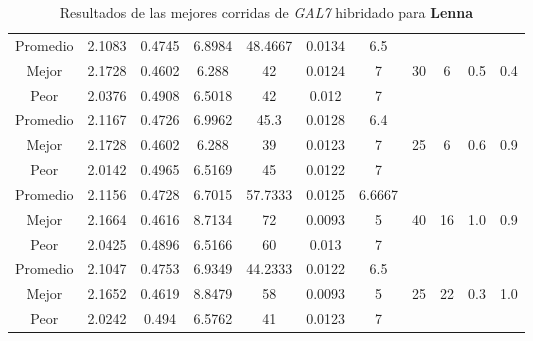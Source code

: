 \begin{table}[h!]
\begin{center}
\begin{tabular}{|c|c|c|c|c|c|c|c|c|c|c|}
        \hline
        \hline
            Promedio  & 2.1083 & 0.4745 & 6.8984 & 48.4667 & 0.0134 & 6.5 &  &  &  & \\
            \cline{1-7}
            Mejor & 2.1728 & 0.4602  & 6.288 & 42 & 0.0124 & 7 & 30 & 6 & 0.5 & 0.4\\
            \cline{1-7}
            Peor & 2.0376 & 0.4908  & 6.5018 & 42 & 0.012 & 7 &  &  &  & \\
        \hline
        \hline
            Promedio  & 2.1167 & 0.4726 & 6.9962 & 45.3 & 0.0128 & 6.4 &  &  &  & \\
            \cline{1-7}
            Mejor & 2.1728 & 0.4602  & 6.288 & 39 & 0.0123 & 7 & 25 & 6 & 0.6 & 0.9\\
            \cline{1-7}
            Peor & 2.0142 & 0.4965  & 6.5169 & 45 & 0.0122 & 7 &  &  &  & \\
        \hline
        \hline
            Promedio  & 2.1156 & 0.4728 & 6.7015 & 57.7333 & 0.0125 & 6.6667 &  &  &  & \\
            \cline{1-7}
            Mejor & 2.1664 & 0.4616  & 8.7134 & 72 & 0.0093 & 5 & 40 & 16 & 1.0 & 0.9\\
            \cline{1-7}
            Peor & 2.0425 & 0.4896  & 6.5166 & 60 & 0.013 & 7 &  &  &  & \\
        \hline
        \hline
            Promedio  & 2.1047 & 0.4753 & 6.9349 & 44.2333 & 0.0122 & 6.5 &  &  &  & \\
            \cline{1-7}
            Mejor & 2.1652 & 0.4619  & 8.8479 & 58 & 0.0093 & 5 & 25 & 22 & 0.3 & 1.0\\
            \cline{1-7}
            Peor & 2.0242 & 0.494  & 6.5762 & 41 & 0.0123 & 7 &  &  &  & \\
        \hline
        \end{tabular}
        \caption{Resultados de las mejores corridas de \emph{GAL7} hibridado para {\bf Lenna}}
        \label{tb:tableGAL7}
    \end{center}
\end{table}
